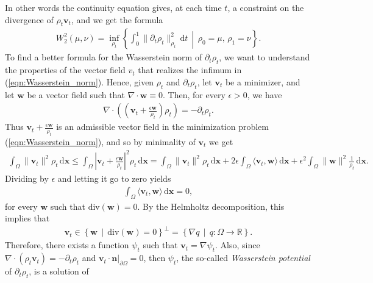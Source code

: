 \documentclass[11pt]{book}
\newcommand{\dx}{\mathrm{d}\mathbf{x}}
\newcommand{\dt}{\mathrm{d}t}
\begin{document}
In other words the continuity equation gives, at each time \( t \), a constraint on the divergence of \( \rho_t\mathbf{v}_t \), and we get the formula
\begin{align}
    W_2^2(\mu, \nu) = \inf_{\rho_t} \left\{ \int_0^1 \| \partial_t \rho_t \|^2_{\rho_t} \, \dt \,\middle|\, \rho_0 = \mu, \, \rho_1 = \nu \right\}.
\end{align}
To find a better formula for the Wasserstein norm of \( \partial_t \rho_t \), we want to understand 
the properties of the vector field \( v_t \) that realizes the infimum in (\ref{eqn:Wasserstein_norm}). 
Hence, given \( \rho_t \) and \( \partial_t \rho_t \), let \( \mathbf{v}_t \) be a minimizer, and let \( \mathbf{w} \) be a vector field such that \(\nabla\cdot\mathbf{w} \equiv 0\). Then, for every \( \epsilon > 0 \), we have
\begin{align*}
    \nabla\cdot \left( \left(\mathbf{v}_t + \frac{\epsilon \mathbf{w}}{\rho_t} \right) \rho_t \right) = -\partial_t \rho_t.
\end{align*}
Thus \( \mathbf{v}_t + \frac{\epsilon \mathbf{w}}{\rho_t} \) is an admissible vector field in the minimization problem  (\ref{eqn:Wasserstein_norm}), and so by minimality of \( \mathbf{v}_t \) we get
\begin{align*}
    \int_\Omega \|\mathbf{v}_t\|^2 \rho_t \, \dx 
    \leq \int_\Omega \left| \mathbf{v}_t + \frac{\epsilon \mathbf{w}}{\rho_t} \right|^2 \rho_t \, \dx = \int_\Omega \|\mathbf{v}_t\|^2 \rho_t \, \dx + 2 \epsilon \int_\Omega \langle \mathbf{v}_t, \mathbf{w} \rangle \, \dx + \epsilon^2 \int_\Omega \|\mathbf{w}\|^2 \frac{1}{\rho_t} \, \dx.
\end{align*}
Dividing by \( \epsilon \) and letting it go to zero yields
\begin{align*}
    \int_\Omega \langle \mathbf{v}_t, \mathbf{w} \rangle \, \dx = 0,
\end{align*}
for every \( \mathbf{w} \) such that \( \text{div}(\mathbf{w}) = 0 \). By the Helmholtz decomposition, this implies that
\begin{align*}
    \mathbf{v}_t \in \left\{ \mathbf{w} \, \middle| \, \text{div}(\mathbf{w}) = 0 \right\}^\perp = \left\{ \nabla q \, \middle| \, q: \Omega \to \mathbb{R} \right\}.
\end{align*}
Therefore, there exists a function \( \psi_t \) such that \( \mathbf{v}_t = \nabla \psi_t \). Also, since \( \nabla\cdot(\rho_t\mathbf{v}_t) = -\partial_t \rho_t \) 
and \( \mathbf{v}_t \cdot \mathbf{n} |_{\partial \Omega} = 0 \), then \( \psi_t \), the so-called {\it Wasserstein potential} of $\partial_t\rho_t$, is a solution of
\end{document}
